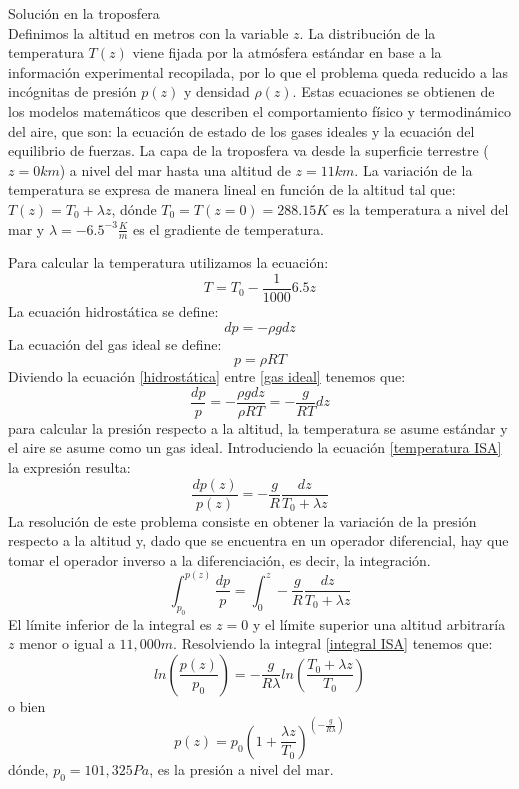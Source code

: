 Solución en la troposfera \cite{franchini2013}\\
Definimos la altitud en metros con la variable $z$. La distribución de la temperatura $T(z)$ viene fijada por la atmósfera estándar en base a la información experimental recopilada, por lo que el problema queda reducido a las incógnitas de presión $p(z)$ y densidad $\rho(z)$.
Estas ecuaciones se obtienen de los modelos matemáticos que describen el comportamiento físico y termodinámico del aire, que son: la ecuación de estado de los gases ideales y la ecuación del equilibrio de fuerzas.
%
La capa de la troposfera va desde la superficie terrestre ($z=0km$) a nivel del mar hasta una altitud de $z=11km$. La variación de la temperatura se expresa de manera lineal en función de la altitud tal que: $T(z)=T_0 + \lambda z$, dónde $T_0 = T(z=0)=288.15 K$ es la temperatura a nivel del mar y $\lambda = -6.5^{-3} \frac{K}{m}$ es el gradiente de temperatura. 

Para calcular la temperatura utilizamos la ecuación:
\begin{equation}
\label{temperatura ISA}
    T = T_0 - \frac{1}{1000} 6.5 z
\end{equation}
La ecuación hidrostática se define:
\begin{equation}
\label{hidrostática}
    dp = -\rho g dz
\end{equation}
La ecuación del gas ideal se define:
\begin{equation}
\label{gas ideal}
    p = \rho R T 
\end{equation}
Diviendo la ecuación \ref{hidrostática} entre \ref{gas ideal} tenemos que:
\begin{equation}
    \frac{dp}{p}=-\frac{\rho g dz}{\rho R T} = - \frac{g}{RT}dz
\end{equation}
para calcular la presión respecto a la altitud, la temperatura se asume estándar y el aire se asume como un gas ideal. 
Introduciendo la ecuación \ref{temperatura ISA} la expresión resulta:
\begin{equation}
    \frac{dp(z)}{p(z)}= - \frac{g}{R} \frac{dz}{T_0 + \lambda z}
\end{equation}
La resolución de este problema consiste en obtener la variación de la presión respecto a la altitud y, dado que se encuentra en un operador diferencial, hay que tomar el operador inverso a la diferenciación, es decir, la integración.
\begin{equation}
\label{integral ISA}
    \int_{p_0}^{p(z)} \frac{dp}{p} = \int_{0}^{z} - \frac{g}{R} \frac{dz}{T_0 + \lambda z}
\end{equation}
El límite inferior de la integral es $z=0$ y el límite superior una altitud arbitraría $z$ menor o igual a $11,000 m$. Resolviendo la integral \ref{integral ISA} tenemos que:
\begin{equation}
    ln (\frac{p(z)}{p_0})= - \frac{g}{R \lambda} ln (\frac{T_0 + \lambda z}{T_0})
\end{equation}
o bien
\begin{equation}
\label{presion ISA}
    p(z) = p_0 (1 + \frac{\lambda z}{T_0})^{(- \frac{g}{R \lambda})}
\end{equation}
dónde, $p_0 = 101,325 Pa$, es la presión a nivel del mar. 

